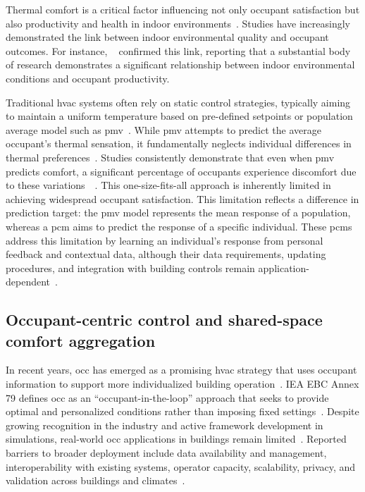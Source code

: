 \label{sec:Intro}
Thermal comfort is a critical factor influencing not only occupant satisfaction but also productivity and health in indoor environments~\cite{bueno_evaluating_2021}. 
Studies have increasingly demonstrated the link between indoor environmental quality and occupant outcomes. 
For instance, ~\cite{bueno_evaluating_2021} confirmed this link, reporting that a substantial body of research demonstrates a significant relationship between indoor environmental conditions and occupant productivity.

Traditional \ac{hvac} systems often rely on static control strategies, typically aiming to maintain a uniform temperature based on pre-defined setpoints or population average model such as \ac{pmv}~\cite{fanger_thermal_1970}.  
While \ac{pmv} attempts to predict the average occupant's thermal sensation, it fundamentally neglects individual differences in thermal preferences~\cite{wang_individual_2018}.  
Studies consistently demonstrate that even when \ac{pmv} predicts comfort, a significant percentage of occupants experience discomfort due to these variations~\cite{cheung_analysis_2019}~\cite{wang_individual_2018}.
This one-size-fits-all approach is inherently limited in achieving widespread occupant satisfaction.
This limitation reflects a difference in prediction target: the \ac{pmv} model represents the mean response of a population, whereas a \ac{pcm} aims to predict the response of a specific individual.
These \acp{pcm} address this limitation by learning an individual's response from personal feedback and contextual data, although their data requirements, updating procedures, and integration with building controls remain application-dependent~\cite{kim_personal_2018-1}.

\subsection{Occupant-centric control and shared-space comfort aggregation}
In recent years, \ac{occ} has emerged as a promising \ac{hvac} strategy that uses occupant information to support more individualized building operation~\cite{soleimanijavid_challenges_2024}.
IEA EBC Annex 79 defines \ac{occ} as an ``occupant-in-the-loop'' approach that seeks to provide optimal and personalized conditions rather than imposing fixed settings~\cite{wagner_international_2024}.
Despite growing recognition in the industry and active framework development in simulations, real-world \ac{occ} applications in buildings remain limited~\cite{soleimanijavid_challenges_2024}.
Reported barriers to broader deployment include data availability and management, interoperability with existing systems, operator capacity, scalability, privacy, and validation across buildings and climates~\cite{obrien_key_2020}\cite{nagy_ten_2023}\cite{soleimanijavid_challenges_2024}.

